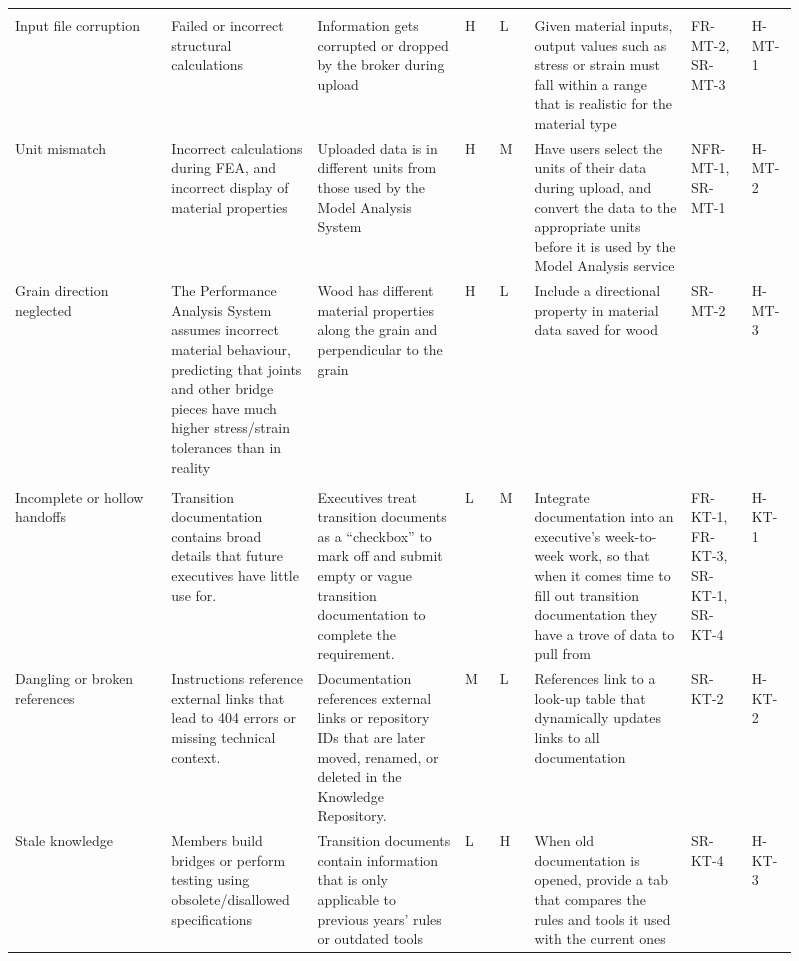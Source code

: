 \documentclass{article}
\begin{document}
\begin{landscape}
{\begin{longtable}{P{0.18\linewidth}P{0.165\linewidth}P{0.17\linewidth}>{\centering\arraybackslash}p{0.04\linewidth}>{\centering\arraybackslash}p{0.04\linewidth}P{0.185\linewidth}P{0.07\linewidth}P{0.055\linewidth}}
\\*
Input file corruption & Failed or incorrect structural calculations & Information gets corrupted or dropped by the broker during upload & H & L & Given material inputs, output values such as stress or strain must fall within a range that is realistic for the material type& FR-MT-2, SR-MT-3 & H-MT-1\\
\cmidrule(l){1-8}
Unit mismatch & Incorrect calculations during FEA, and incorrect display of material properties & Uploaded data is in different units from those used by the Model Analysis System & H & M & Have users select the units of their data during upload, and convert the data to the appropriate units before it is used by the Model Analysis service &  NFR-MT-1, SR-MT-1 & H-MT-2\\
\cmidrule(l){1-8}
Grain direction neglected & The Performance Analysis System assumes incorrect material behaviour, predicting that joints and other bridge pieces have much higher stress/strain tolerances than in reality & Wood has different material properties along the grain and perpendicular to the grain  & H & L & Include a directional property in material data saved for wood & SR-MT-2& H-MT-3\\
\\*
Incomplete or hollow handoffs &Transition documentation contains broad details that future executives have little use for. & Executives treat transition documents as a ``checkbox'' to mark off and submit empty or vague transition documentation to complete the requirement.& L & M & Integrate documentation into an executive's week-to-week work, so that when it comes time to fill out transition documentation they have a trove of data to pull from& FR-KT-1, FR-KT-3, SR-KT-1, SR-KT-4 & H-KT-1 \\
\cmidrule(l){1-8}
Dangling or broken references & Instructions reference external links that lead to 404 errors or missing technical context. & Documentation references external links or repository IDs that are later moved, renamed, or deleted in the Knowledge Repository.& M & L & References link to a look-up table that dynamically updates links to all documentation& SR-KT-2 & H-KT-2 \\
\cmidrule(l){1-8}
Stale knowledge & Members build bridges or perform testing using obsolete/disallowed specifications & Transition documents contain information that is only applicable to previous years' rules or outdated tools& L & H & When old documentation is opened, provide a tab that compares the rules and tools it used with the current ones& SR-KT-4 & H-KT-3 \\

\end{longtable}}
\end{landscape}
\end{document}
